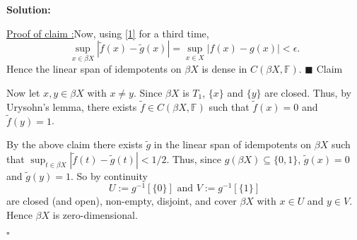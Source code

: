 \documentclass[12pt]{article}
\newcounter{ProofCounter}
\newcounter{ClaimCounter}[ProofCounter]
\newenvironment{Solution}{\stepcounter{ProofCounter}\textbf{Solution:}}{\hfill$\square$}
\newenvironment{claimproof}[1]{\par\noindent\underline{Proof of claim \theClaimCounter:}\space#1}{\hfill $\blacksquare$ Claim \theClaimCounter}
\begin{document}
\begin{Solution}
\begin{enumerate}
\begin{claimproof}
        Now, using \eqref{1} for a third time,
        \[
          \sup_{x \in \beta X}|\tilde{f}(x) - \tilde{g}(x)| = \sup_{x \in X}|f(x) - g(x)| < \epsilon.
        \]
        Hence the linear span of idempotents on $\beta X$ is dense in $C(\beta X, \mathbb{F})$.
      \end{claimproof}

      Now let $x, y \in \beta X$ with $x \neq y$. Since $\beta X$ is $T_1$, $\{x\}$ and $\{y\}$ are closed. Thus, by Urysohn's lemma, there exists
      $\tilde{f}
      \in C(\beta X, \mathbb{F})$ such that $\tilde{f}(x) = 0$ and $\tilde{f}(y) = 1$. 
      
      By the above claim there exists $\tilde{g}$ in the linear span of idempotents on
      $\beta X$ such that $\sup_{t \in \beta X}|\tilde{f}(t) - \tilde{g}(t)| < 1/2$. Thus, since $g(\beta X) \subseteq \{0,1\}$,
      $\tilde{g}(x) = 0$ and $\tilde{g}(y) = 1$. So by continuity
      \[
        U := g^{-1}[\{0\}] \text{ and } V := g^{-1}[\{1\}]
      \]
      are closed (and open), non-empty, disjoint, and cover $\beta X$ with $x \in U$ and $y \in V$. Hence $\beta X$ is
      zero-dimensional.
  \end{enumerate}
\end{Solution}
\end{document}
